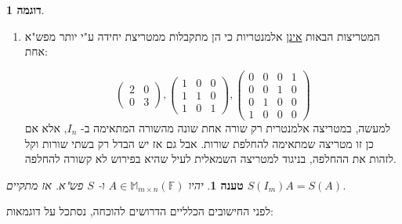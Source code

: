 \documentclass[12pt]{report}
\theoremstyle{plain}
\newtheorem{proposition}[theorem]{טענה}
\theoremstyle{definition}
\newtheorem{example}{דוגמה}[chapter]
\newcommand{\F}{\mathbb{F}}
\newcommand{\M}{\mathbb{M}}
\newcommand{\0}{\mathbf{0}}
\begin{document}
\begin{example}
\begin{enumerate}[label=\alph*.]
$$
\begin{aligned}
S=(R_2+2R_1\to R_2)\implies S(I_2)&=\begin{pmatrix}
1 & 0\\
2 & 1
\end{pmatrix} \\
S=(R_2+3R_1\to R_2)\implies S(I_3)&=\begin{pmatrix}
1 &0 &0 \\
3 & 1 &0 \\
0 &0 &1
\end{pmatrix} \\
S=(R_3+4R_2\to R_3)\implies S(I_4)&=\begin{pmatrix}
1 &0 &0 &0 \\
0 & 1 &0 &0 \\
0 &4 &1 &0 \\
0 &0 &0 &1
\end{pmatrix}
\end{aligned}
$$

\item 
המטריצות הבאות
\underline{אינן}
אלמנטריות כי הן מתקבלות ממטריצת יחידה ע"י יותר מפש"א אחת:

$$
\begin{pmatrix}
2 & 0\\
0 & 3
\end{pmatrix}, \begin{pmatrix}
1 &0 &0 \\
1 & 1 &0 \\
1 &0 &1
\end{pmatrix}, \begin{pmatrix}
0 &0 &0 &1 \\
0 & 0 &1 &0 \\
0 &1 &0 &0 \\
1 &0 &0 &0
\end{pmatrix}
$$
למעשה, במטריצה אלמנטרית רק שורה אחת שונה מהשורה המתאימה ב-
$I_n$,
אלא אם כן זו מטריצה שמתאימה להחלפת שורות. אבל גם אז יש הבדל רק בשתי שורות וקל לזהות את ההחלפה, בניגוד למטריצה השמאלית לעיל שהיא בפירוש לא קשורה להחלפה.

\end{enumerate}
\end{example}

\begin{proposition}\label{prop:elementary}
יהיו
$A\in\M_{m\times n}(\F)$
ו-
$S$
פש"א. אז מתקיים
$S(I_m)A=S(A)$.
\end{proposition}

לפני החישובים הכלליים הדרושים להוכחה, נסתכל על דוגמאות:
\end{document}
